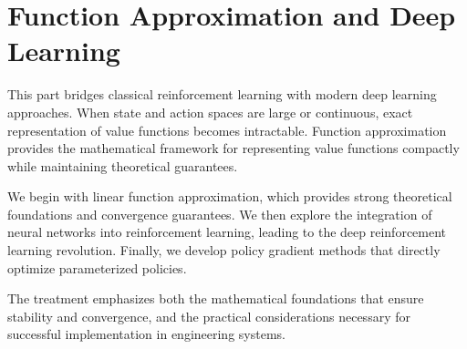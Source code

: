 \part{Function Approximation and Deep Learning}

This part bridges classical reinforcement learning with modern deep learning approaches. When state and action spaces are large or continuous, exact representation of value functions becomes intractable. Function approximation provides the mathematical framework for representing value functions compactly while maintaining theoretical guarantees.

We begin with linear function approximation, which provides strong theoretical foundations and convergence guarantees. We then explore the integration of neural networks into reinforcement learning, leading to the deep reinforcement learning revolution. Finally, we develop policy gradient methods that directly optimize parameterized policies.

The treatment emphasizes both the mathematical foundations that ensure stability and convergence, and the practical considerations necessary for successful implementation in engineering systems.




